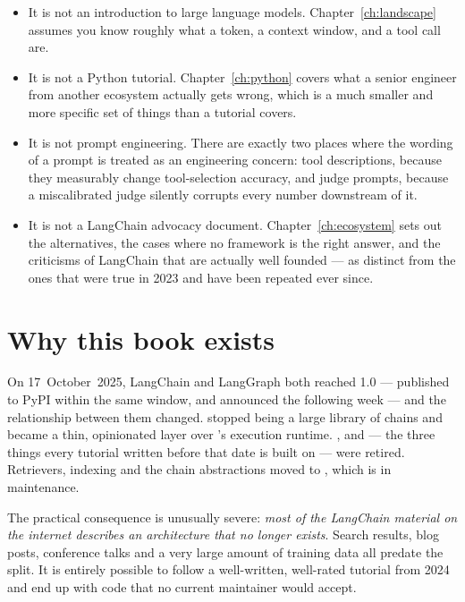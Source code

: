 \begin{itemize}[leftmargin=1.4em]
  \item It is not an introduction to large language models.
        Chapter~\ref{ch:landscape} assumes you know roughly what a token, a
        context window, and a tool call are.
  \item It is not a Python tutorial. Chapter~\ref{ch:python} covers what a
        senior engineer from another ecosystem actually gets wrong, which is a
        much smaller and more specific set of things than a tutorial covers.
  \item It is not prompt engineering. There are exactly two places where the
        wording of a prompt is treated as an engineering concern: tool
        descriptions, because they measurably change tool-selection accuracy,
        and judge prompts, because a miscalibrated judge silently corrupts every
        number downstream of it.
  \item It is not a LangChain advocacy document. Chapter~\ref{ch:ecosystem} sets
        out the alternatives, the cases where no framework is the right answer,
        and the criticisms of LangChain that are actually well founded --- as
        distinct from the ones that were true in 2023 and have been repeated ever
        since.
\end{itemize}

\section*{Why this book exists}

On 17~October~2025, LangChain and LangGraph both reached 1.0 --- published to
PyPI within the same window, and announced the following week --- and the
relationship between them changed.  stopped being a large library
of chains and became a thin, opinionated layer over 's execution
runtime. ,  and  --- the
three things every tutorial written before that date is built on --- were
retired. Retrievers, indexing and the chain abstractions moved to
, which is in maintenance.

The practical consequence is unusually severe: \emph{most of the LangChain
material on the internet describes an architecture that no longer exists}. Search
results, blog posts, conference talks and a very large amount of training data
all predate the split. It is entirely possible to follow a well-written,
well-rated tutorial from 2024 and end up with code that no current maintainer
would accept.


